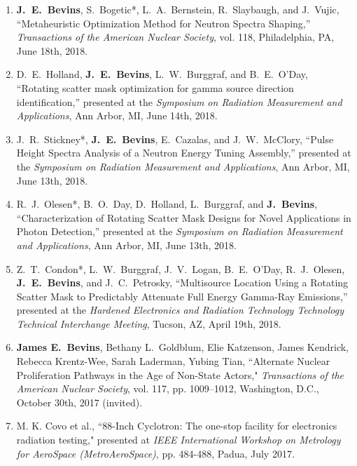 \begin{enumerate}
  \item \textbf{J.\ E.\ Bevins}, S.\ Bogetic*, L.\ A.\ Bernstein, R.\ Slaybaugh, and J.\ Vujic, ``Metaheuristic Optimization Method for Neutron Spectra Shaping,” \textit{Transactions of the American Nuclear Society}, vol. 118, Philadelphia, PA, June 18th, 2018.
  
  \item D.\ E.\ Holland, \textbf{J.\ E.\ Bevins}, L.\ W.\ Burggraf, and B.\ E.\ O’Day, ``Rotating scatter mask optimization for gamma source direction identification,” presented at the \textit{Symposium on Radiation Measurement and Applications}, Ann Arbor, MI, June 14th, 2018.

  \item J.\ R.\ Stickney*, \textbf{J.\ E.\ Bevins}, E.\ Cazalas, and J.\ W.\ McClory, ``Pulse Height Spectra Analysis of a Neutron Energy Tuning Assembly,” presented at the \textit{Symposium on Radiation Measurement and Applications}, Ann Arbor, MI, June 13th, 2018.

  \item R.\ J.\ Olesen*, B.\ O.\ Day, D.\ Holland, L.\ Burggraf, and \textbf{J.\ Bevins}, ``Characterization of Rotating Scatter Mask Designs for Novel Applications in Photon Detection,” presented at the \textit{Symposium on Radiation Measurement and Applications}, Ann Arbor, MI, June 13th, 2018.

  \item Z.\ T.\ Condon*, L.\ W.\ Burggraf, J.\ V.\ Logan, B.\ E.\ O’Day, R.\ J.\ Olesen, \textbf{J.\ E.\ Bevins}, and J.\ C.\ Petrosky, ``Multisource Location Using a Rotating Scatter Mask to Predictably Attenuate Full Energy Gamma-Ray Emissions,” presented at the \textit{Hardened Electronics and Radiation Technology Technology Technical Interchange Meeting}, Tucson, AZ, April 19th, 2018.
  
  \item \textbf{James E.\ Bevins}, Bethany L.\ Goldblum, Elie Katzenson, James Kendrick, Rebecca Krentz-Wee, Sarah Laderman, Yubing Tian, ``Alternate Nuclear Proliferation Pathways in the Age of Non-State Actors," \textit{Transactions of the American Nuclear Society}, vol. 117, pp. 1009–1012, Washington, D.C., October 30th, 2017 (invited).
  
  \item M. K. Covo et al., ``88-Inch Cyclotron: The one-stop facility for electronics radiation testing," presented at \textit{IEEE International Workshop on Metrology for AeroSpace (MetroAeroSpace)}, pp. 484-488, Padua, July 2017.


\end{enumerate}
